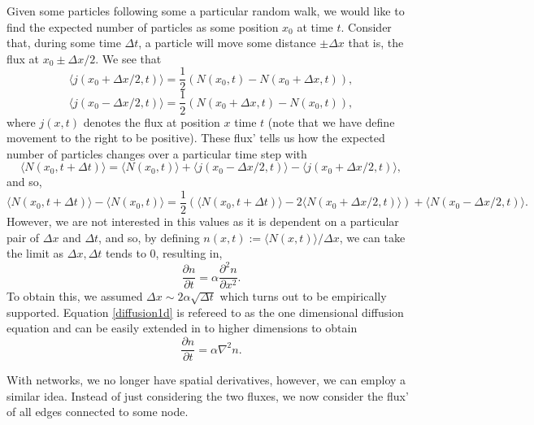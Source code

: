 \documentclass[
]{article}
\theoremstyle{definition}
\theoremstyle{definition}
\begin{document}
Given some particles following some a particular random walk, we would
like to find the expected number of particles as some position \(x_0\)
at time \(t\). Consider that, during some time \(\Delta t\), a particle
will move some distance \(\pm \Delta x\) that is, the flux at
\(x_0 \pm \Delta x/ 2\). We see that
\[\langle j(x_0 + \Delta x / 2, t) \rangle = \frac{1}{2}(N(x_0, t) - N(x_0 + \Delta x, t)),\]
\[\langle j(x_0 - \Delta x / 2, t) \rangle = \frac{1}{2}(N(x_0 + \Delta x, t) - N(x_0, t)),\]
where \(j(x, t)\) denotes the flux at position \(x\) time \(t\) (note
that we have define movement to the right to be positive). These flux'
tells us how the expected number of particles changes over a particular
time step with
\[\langle N(x_0, t + \Delta t) \rangle = \langle N(x_0, t) \rangle + 
  \langle j(x_0 - \Delta x / 2, t) \rangle -
  \langle j(x_0 + \Delta x / 2, t) \rangle,\] and so,
\[\langle N(x_0, t + \Delta t) \rangle - \langle N(x_0, t) \rangle = 
  \frac{1}{2}(\langle N(x_0, t + \Delta t) \rangle - 
   2\langle N(x_0 + \Delta x / 2, t) \rangle) +
  \langle N(x_0 - \Delta x / 2, t) \rangle.\] However, we are not
interested in this values as it is dependent on a particular pair of
\(\Delta x\) and \(\Delta t\), and so, by defining
\(n(x, t) := \langle N(x, t) \rangle / \Delta x\), we can take the limit
as \(\Delta x, \Delta t\) tends to 0, resulting in,
\begin{equation}\label{diffusion1d}
\frac{\partial{n}}{\partial{t}} = \alpha \frac{\partial^2{n}}{\partial{x}^2}.  
\end{equation} To obtain this, we assumed
\(\Delta x \sim 2\alpha \sqrt{\Delta t}\) which turns out to be
empirically supported. Equation \ref{diffusion1d} is refereed to as the
one dimensional diffusion equation and can be easily extended in to
higher dimensions to obtain \begin{equation}
  \frac{\partial{n}}{\partial{t}} = \alpha \nabla ^2 n.
\end{equation}

With networks, we no longer have spatial derivatives, however, we can
employ a similar idea. Instead of just considering the two fluxes, we
now consider the flux' of all edges connected to some node.
\end{document}
